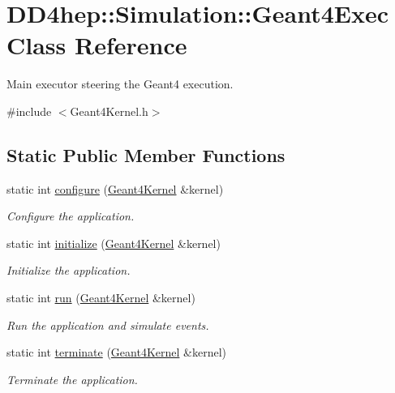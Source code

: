 \hypertarget{class_d_d4hep_1_1_simulation_1_1_geant4_exec}{
\section{DD4hep::Simulation::Geant4Exec Class Reference}
\label{class_d_d4hep_1_1_simulation_1_1_geant4_exec}
}


Main executor steering the Geant4 execution.  


{\ttfamily \#include $<$Geant4Kernel.h$>$}\subsection*{Static Public Member Functions}
\begin{DoxyCompactItemize}
\item 
static int \hyperlink{class_d_d4hep_1_1_simulation_1_1_geant4_exec_a68d70832e5acb1c074ce12cae898af09}{configure} (\hyperlink{class_d_d4hep_1_1_simulation_1_1_geant4_kernel}{Geant4Kernel} \&kernel)
\begin{DoxyCompactList}\small\item\em Configure the application. \item\end{DoxyCompactList}\item 
static int \hyperlink{class_d_d4hep_1_1_simulation_1_1_geant4_exec_ae5486a8c520af49cbcc5d5ba4323e773}{initialize} (\hyperlink{class_d_d4hep_1_1_simulation_1_1_geant4_kernel}{Geant4Kernel} \&kernel)
\begin{DoxyCompactList}\small\item\em Initialize the application. \item\end{DoxyCompactList}\item 
static int \hyperlink{class_d_d4hep_1_1_simulation_1_1_geant4_exec_a006a064ae70aa7839d656ae7cdd8fc59}{run} (\hyperlink{class_d_d4hep_1_1_simulation_1_1_geant4_kernel}{Geant4Kernel} \&kernel)
\begin{DoxyCompactList}\small\item\em Run the application and simulate events. \item\end{DoxyCompactList}\item 
static int \hyperlink{class_d_d4hep_1_1_simulation_1_1_geant4_exec_a592e79f8ae539bd7491cd3af0572555c}{terminate} (\hyperlink{class_d_d4hep_1_1_simulation_1_1_geant4_kernel}{Geant4Kernel} \&kernel)
\begin{DoxyCompactList}\small\item\em Terminate the application. \item\end{DoxyCompactList}\end{DoxyCompactItemize}


